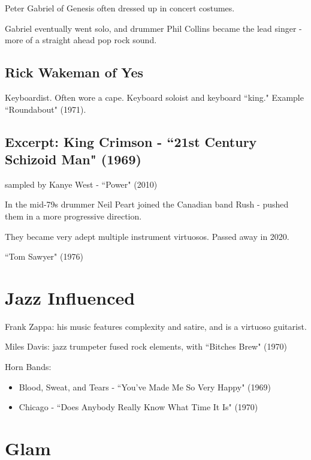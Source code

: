 \documentclass[12pt, a4paper, twoside, openright, titlepage]{book}
\begin{document}
\begin{rmk}{}{}
    Peter Gabriel of Genesis often dressed up in concert costumes.
\end{rmk}

Gabriel eventually went solo, and drummer Phil Collins became the lead singer - more of a straight ahead pop rock sound. 

\subsection{Rick Wakeman of Yes}

Keyboardist. Often wore a cape. Keyboard soloist and keyboard ``king." Example ``Roundabout" (1971).

\subsection{Excerpt: King Crimson - ``21st Century Schizoid Man" (1969)}

sampled by Kanye West - ``Power" (2010)

\begin{rmk}{}{}
    In the mid-79s drummer Neil Peart joined the Canadian band Rush - pushed them in a more progressive direction.
\end{rmk}

They became very adept multiple instrument virtuosos. Passed away in 2020. 

\begin{eg}{}{}
    ``Tom Sawyer" (1976)
\end{eg}

\section{Jazz Influenced}

Frank Zappa: his music features complexity and satire, and is a virtuoso guitarist.


Miles Davis: jazz trumpeter fused rock elements, with ``Bitches Brew" (1970)


Horn Bands: \begin{itemize}
    \item Blood, Sweat, and Tears - ``You've Made Me So Very Happy" (1969)
    \item Chicago - ``Does Anybody Really Know What Time It Is" (1970)
\end{itemize}

\section{Glam}
\end{document}
